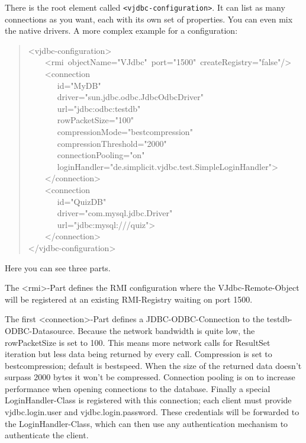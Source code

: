 \documentclass[10pt,a4paper,english]{article}
\begin{document}
There is the root element called \texttt{<vjdbc-configuration>}. It can list as many connections as you want, each with its own set of properties. You can even mix the native drivers. A more complex example for a configuration:
\begin{quote}{\ttfamily \raggedright \noindent
<vjdbc-configuration>~\\
~~~~<rmi~objectName="VJdbc"~port="1500"~createRegistry="false"/>~\\
~~~~<connection~\\
~~~~~~~id="MyDB"~\\
~~~~~~~driver="sun.jdbc.odbc.JdbcOdbcDriver"~\\
~~~~~~~url="jdbc:odbc:testdb"~\\
~~~~~~~rowPacketSize="100"~\\
~~~~~~~compressionMode="bestcompression"~\\
~~~~~~~compressionThreshold="2000"~\\
~~~~~~~connectionPooling="on"~\\
~~~~~~~loginHandler="de.simplicit.vjdbc.test.SimpleLoginHandler">~\\
~~~~</connection>~\\
~~~~<connection~\\
~~~~~~~id="QuizDB"~\\
~~~~~~~driver="com.mysql.jdbc.Driver"~\\
~~~~~~~url="jdbc:mysql:///quiz">~\\
~~~~</connection>~\\
</vjdbc-configuration>
}\end{quote}

Here you can see three parts.

The {\textless}rmi{\textgreater}-Part defines the RMI configuration where the VJdbc-Remote-Object will be registered at an existing RMI-Registry waiting on port 1500.

The first {\textless}connection{\textgreater}-Part defines a JDBC-ODBC-Connection to the testdb-ODBC-Datasource. Because the network bandwidth is quite low, the rowPacketSize is set to 100. This means more network calls for ResultSet iteration but less data being returned by every call. Compression is set to bestcompression; default is bestspeed. When the size of the returned data doesn't surpass 2000 bytes it won't be compressed. Connection pooling is on to increase performance when opening connections to the database. Finally a special LoginHandler-Class is registered with this connection; each client must provide vjdbc.login.user and vjdbc.login.password. These credentials will be forwarded to the LoginHandler-Class, which can then use any authentication mechanism to authenticate the client.
\end{document}
